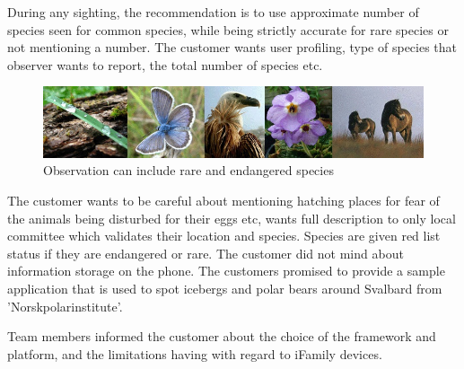 During any sighting, the recommendation is to use approximate number of species seen for common species, while being strictly accurate for rare species or not mentioning a number. The customer wants user profiling, type of species that observer wants to report, the total number of species etc.

\begin{figure}[htb]
	\centering
	\includegraphics[width=1\textwidth]{prestudy/field_study/flora_fauna_Nikola.jpg}
	\caption{Observation can include rare and endangered species}
	\label{fig:field_study_species}
\end{figure}

The customer wants to be careful about mentioning hatching places for fear of the animals being disturbed for their eggs etc, wants full description to only local committee which validates their location and species. Species are given red list status if they are endangered or rare. The customer did not mind about information storage on the phone. The customers promised to provide a sample application that is used to spot icebergs and polar bears around Svalbard from 'Norskpolarinstitute'.\newline

Team members informed the customer about the choice of the framework and platform, and the limitations having with regard to iFamily devices.